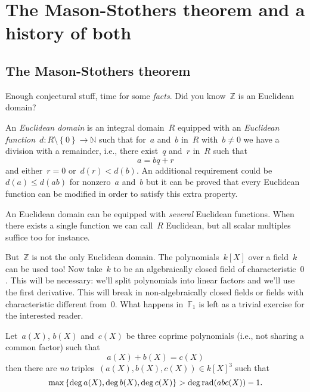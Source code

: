 \section{The Mason-Stothers theorem and a history of both}
\label{section:mason-stothers}

\subsection{The Mason-Stothers theorem}

Enough conjectural stuff, time for some \emph{facts}. Did you know~$\mathbb{Z}$ is an Euclidean domain?

\begin{definition}
  An \emph{Euclidean domain} is an integral domain~$R$ equipped with an \emph{Euclidean function}~$d\colon R\setminus\left\{ 0 \right\}\to\mathbb{N}$ such that for~$a$ and~$b$ in~$R$ with~$b\neq 0$ we have a division with a remainder, i.e., there exist~$q$ and~$r$ in~$R$ such that
  \begin{equation}
    a=bq+r
  \end{equation}
  and either~$r=0$ or~$d(r)<d(b)$. An additional requirement could be~$d(a)\leq d(ab)$ for nonzero~$a$ and~$b$ but it can be proved that every Euclidean function can be modified in order to satisfy this extra property.
\end{definition}

\begin{remark}
  An Euclidean domain can be equipped with \emph{several} Euclidean functions. When there exists a single function we can call~$R$ Euclidean, but all scalar multiples suffice too for instance.
\end{remark}

But~$\mathbb{Z}$ is not the only Euclidean domain. The polynomials~$k[X]$ over a field~$k$ can be used too! Now take~$k$ to be an algebraically closed field of characteristic~$0$. This will be necessary: we'll split polynomials into linear factors and we'll use the first derivative. This will break in non-algebraically closed fields or fields with characteristic different from~$0$. What happens in~$\mathbb{F}_1$ is left as a trivial exercise for the interested reader.

\begin{theorem}
  \label{theorem:mason-stothers}
  Let~$a(X)$, $b(X)$ and~$c(X)$ be three coprime polynomials (i.e., not sharing a common factor) such that
  \begin{equation}
    \label{equation:mason-stothers-equality}
    a(X)+b(X)=c(X)
  \end{equation}
  then there are \emph{no} triples~$(a(X),b(X),c(X))\in k[X]^3$ such that
  \begin{equation}
    \max\left\{ \deg a(X),\deg b(X),\deg c(X) \right\}>\deg\operatorname{rad}(abc(X))-1.
  \end{equation}
\end{theorem}

